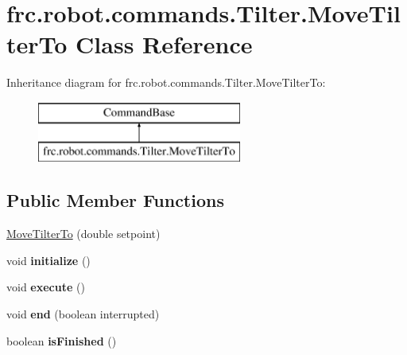 \hypertarget{classfrc_1_1robot_1_1commands_1_1_tilter_1_1_move_tilter_to}{}\section{frc.\+robot.\+commands.\+Tilter.\+Move\+Tilter\+To Class Reference}
\label{classfrc_1_1robot_1_1commands_1_1_tilter_1_1_move_tilter_to}
Inheritance diagram for frc.\+robot.\+commands.\+Tilter.\+Move\+Tilter\+To\+:\begin{figure}[H]
\begin{center}
\leavevmode
\includegraphics[height=2.000000cm]{classfrc_1_1robot_1_1commands_1_1_tilter_1_1_move_tilter_to}
\end{center}
\end{figure}
\subsection*{Public Member Functions}
\begin{DoxyCompactItemize}
\item 
\mbox{\hyperlink{classfrc_1_1robot_1_1commands_1_1_tilter_1_1_move_tilter_to_a6e1d8a18c1622969836f2c8fb817aeeb}{Move\+Tilter\+To}} (double setpoint)
\item 
\mbox{\label{classfrc_1_1robot_1_1commands_1_1_tilter_1_1_move_tilter_to_ae623504d5290d0e4a21787964cce33aa}} 
void {\bfseries initialize} ()
\item 
\mbox{\label{classfrc_1_1robot_1_1commands_1_1_tilter_1_1_move_tilter_to_a7d3a511bd479cb7a3f79c582eda9163b}} 
void {\bfseries execute} ()
\item 
\mbox{\label{classfrc_1_1robot_1_1commands_1_1_tilter_1_1_move_tilter_to_aad6ccd8a187180809b1861daa5e10b31}} 
void {\bfseries end} (boolean interrupted)
\item 
\mbox{\label{classfrc_1_1robot_1_1commands_1_1_tilter_1_1_move_tilter_to_a7dc39f4e9a69d9b7dd0d8832c0b10735}} 
boolean {\bfseries is\+Finished} ()
\end{DoxyCompactItemize}


